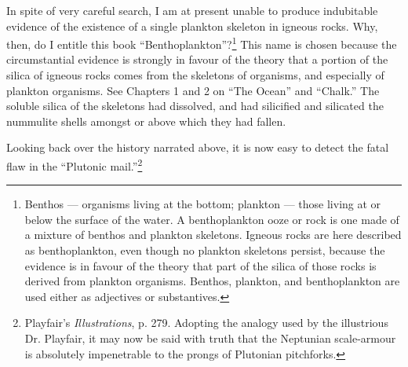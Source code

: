 \documentclass[a4paper, 12pt, oneside, landscape]{article}
\begin{document}
In spite of very careful search, I am at present unable to produce indubitable evidence of the existence of a single plankton skeleton in igneous rocks. Why, then, do I entitle this book ``Benthoplankton''?\footnote{Benthos --- organisms living at the bottom; plankton --- those living at or below the surface of the water. A benthoplankton ooze or rock is one made of a mixture of benthos and plankton skeletons. Igneous rocks are here described as benthoplankton, even though no plankton skeletons persist, because the evidence is in favour of the theory that part of the silica of those rocks is derived from plankton organisms. Benthos, plankton, and benthoplankton are used either as adjectives or substantives.} This name is chosen because the circumstantial evidence is strongly in favour of the theory that a portion of the silica of igneous rocks comes from the skeletons of organisms, and especially of plankton organisms. See Chapters 1 and 2 on ``The Ocean'' and ``Chalk.'' The soluble silica of the skeletons had dissolved, and had silicified and silicated the nummulite shells amongst or above which they had fallen.

Looking back over the history narrated above, it is now easy to detect the fatal flaw in the ``Plutonic mail.''\footnote{Playfair's \emph{Illustrations}, p. 279. Adopting the analogy used by the illustrious Dr. Playfair, it may now be said with truth that the Neptunian scale-armour is absolutely impenetrable to the prongs of Plutonian pitchforks.}
\end{document}
